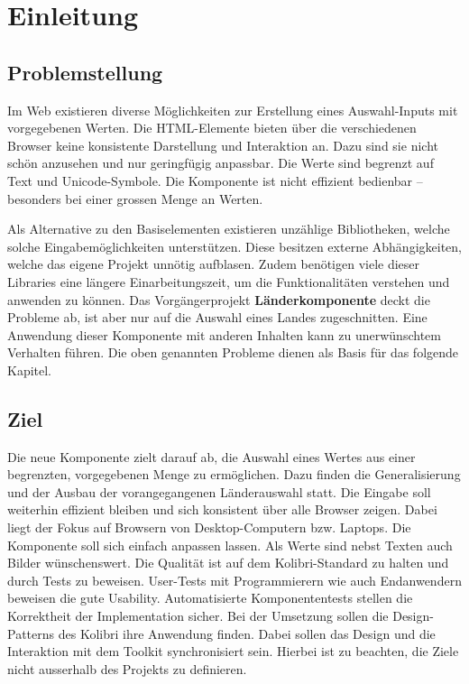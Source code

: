 \chapter{Einleitung}
\label{chap:intro}


\section{Problemstellung}
\label{sec:problem}

Im Web existieren diverse Möglichkeiten zur Erstellung eines Auswahl-Inputs mit vorgegebenen Werten. 
Die HTML-Elemente bieten über die verschiedenen Browser keine konsistente Darstellung und Interaktion an. 
Dazu sind sie nicht schön anzusehen und nur geringfügig anpassbar. 
Die Werte sind begrenzt auf Text und Unicode-Symbole. 
Die Komponente ist nicht effizient bedienbar – besonders bei einer grossen Menge an Werten. 

Als Alternative zu den Basiselementen existieren unzählige Bibliotheken, welche solche Eingabemöglichkeiten unterstützen. 
Diese besitzen externe Abhängigkeiten, welche das eigene Projekt unnötig aufblasen. 
Zudem benötigen viele dieser Libraries eine längere Einarbeitungszeit, um die Funktionalitäten verstehen und anwenden zu können. 
Das Vorgängerprojekt \textbf{Länderkomponente} deckt die Probleme ab, ist aber nur auf die Auswahl eines Landes zugeschnitten. 
Eine Anwendung dieser Komponente mit anderen Inhalten kann zu unerwünschtem Verhalten führen. 
Die oben genannten Probleme dienen als Basis für das folgende Kapitel. 


\section{Ziel}
\label{sec:goal}

Die neue Komponente  zielt darauf ab, die Auswahl eines Wertes aus einer begrenzten, vorgegebenen Menge zu ermöglichen.
Dazu finden die Generalisierung und der Ausbau der vorangegangenen Länderauswahl statt. 
Die Eingabe soll weiterhin effizient bleiben und sich konsistent über alle Browser zeigen. 
Dabei liegt der Fokus auf Browsern von Desktop-Computern bzw. Laptops. 
Die Komponente soll sich einfach anpassen lassen.
Als Werte sind nebst Texten auch Bilder wünschenswert. 
Die Qualität ist auf dem Kolibri-Standard zu halten und durch Tests zu beweisen. 
User-Tests mit Programmierern wie auch Endanwendern beweisen die gute Usability.
Automatisierte Komponententests stellen die Korrektheit der Implementation sicher. 
Bei der Umsetzung sollen die Design-Patterns des Kolibri ihre Anwendung finden. 
Dabei sollen das Design und die Interaktion mit dem Toolkit synchronisiert sein. 
Hierbei ist zu beachten, die Ziele nicht ausserhalb des Projekts zu definieren. 


